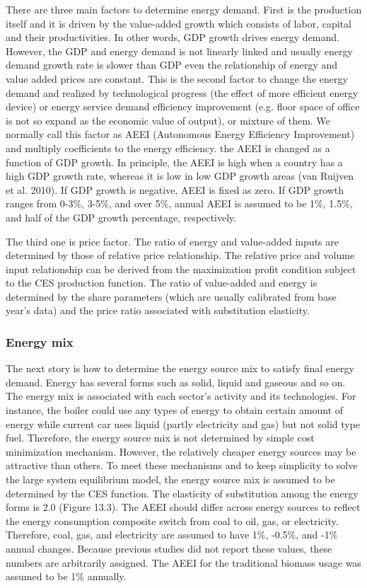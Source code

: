 \documentclass[10pt,a4paper,titlepage,dvipdfmx]{book}
\begin{document}
There are three main factors to determine energy demand. First is the production itself and it is driven by the value-added growth which consists of labor, capital and their productivities. In other words, GDP growth drives energy demand. However, the GDP and energy demand is not linearly linked and usually energy demand growth rate is slower than GDP even the relationship of energy and value added prices are constant. This is the second factor to change the energy demand and realized by technological progress (the effect of more efficient energy device) or energy service demand efficiency improvement (e.g. floor space of office is not so expand as the economic value of output), or mixture of them. We normally call this factor as AEEI (Autonomous Energy Efficiency Improvement) and multiply coefficients to the energy efficiency. the AEEI is changed as a function of GDP growth. In principle, the AEEI is high when a country has a high GDP growth rate, whereas it is low in low GDP growth areas (van Ruijven et al. 2010). If GDP growth is negative, AEEI is fixed as zero. If GDP growth ranges from 0-3\%, 3-5\%, and over 5\%, annual AEEI is assumed to be 1\%, 1.5\%, and half of the GDP growth percentage, respectively. 

The third one is price factor. The ratio of energy and value-added inputs are determined by those of relative price relationship. The relative price and volume input relationship can be derived from the maximization profit condition subject to the CES production function. The ratio of value-added and energy is determined by the share parameters (which are usually calibrated from base year's data) and the price ratio associated with substitution elasticity.

\subsubsection{\label{subsubsec:EneMix}Energy mix}

The next story is how to determine the energy source mix to satisfy final energy demand. Energy has several forms such as solid, liquid and gaseous and so on. The energy mix is associated with each sector's activity and its technologies. For instance, the boiler could use any types of energy to obtain certain amount of energy while current car uses liquid (partly electricity and gas) but not solid type fuel. Therefore, the energy source mix is not determined by simple cost minimization mechanism. However, the relatively cheaper energy sources may be attractive than others. To meet these mechanisms and to keep simplicity to solve the large system equilibrium model, the energy source mix is assumed to be determined by the CES function. The elasticity of substitution among the energy forms is 2.0 (Figure 13.3). The AEEI should differ across energy sources to reflect the energy consumption composite switch from coal to oil, gas, or electricity. Therefore, coal, gas, and electricity are assumed to have 1\%, -0.5\%, and -1\% annual changes. Because previous studies did not report these values, these numbers are arbitrarily assigned. The AEEI for the traditional biomass usage was assumed to be 1\% annually.
\end{document}
